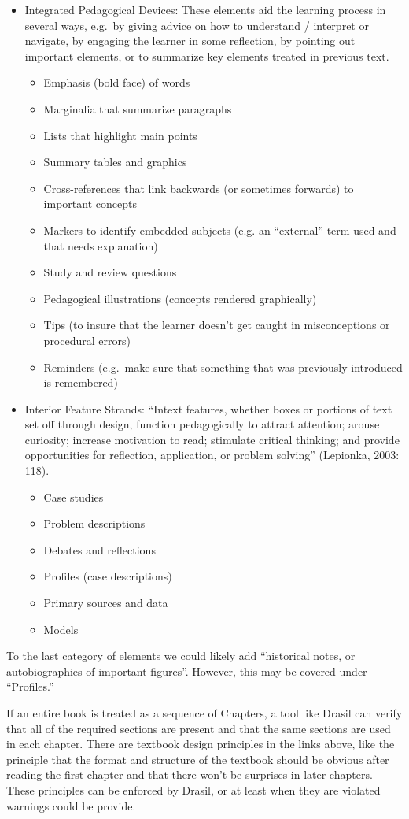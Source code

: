 \documentclass[12pt]{article}
\begin{document}
\begin{itemize}
\begin{itemize}
  \end{itemize}
\item Integrated Pedagogical Devices: These elements aid the learning process in
  several ways, e.g.\ by giving advice on how to understand / interpret or
  navigate, by engaging the learner in some reflection, by pointing out
  important elements, or to summarize key elements treated in previous text.
  \begin{itemize}
  \item Emphasis (bold face) of words
  \item Marginalia that summarize paragraphs
  \item Lists that highlight main points
  \item Summary tables and graphics
  \item Cross-references that link backwards (or sometimes forwards) to important
    concepts
  \item Markers to identify embedded subjects (e.g. an ``external'' term used
    and that needs explanation)
  \item Study and review questions
  \item Pedagogical illustrations (concepts rendered graphically)
  \item Tips (to insure that the learner doesn't get caught in misconceptions or
    procedural errors)
  \item Reminders (e.g.\ make sure that something that was previously introduced
    is remembered)
  \end{itemize}
\item Interior Feature Strands: ``Intext features, whether boxes or portions of
  text set off through design, function pedagogically to attract attention;
  arouse curiosity; increase motivation to read; stimulate critical thinking; and
  provide opportunities for reflection, application, or problem solving''
  (Lepionka, 2003: 118).
  \begin{itemize}
  \item Case studies
  \item Problem descriptions
  \item Debates and reflections
  \item Profiles (case descriptions)
  \item Primary sources and data
  \item Models
  \end{itemize}
\end{itemize}

To the last category of elements we could likely add ``historical notes, or
autobiographies of important figures''.  However, this may be covered under
``Profiles.''

If an entire book is treated as a sequence of Chapters, a tool like Drasil can
verify that all of the required sections are present and that the same sections
are used in each chapter.  There are textbook design principles in the links
above, like the principle that the format and structure of the textbook should
be obvious after reading the first chapter and that there won't be surprises in
later chapters.  These principles can be enforced by Drasil, or at least when
they are violated warnings could be provide.
\end{document}
